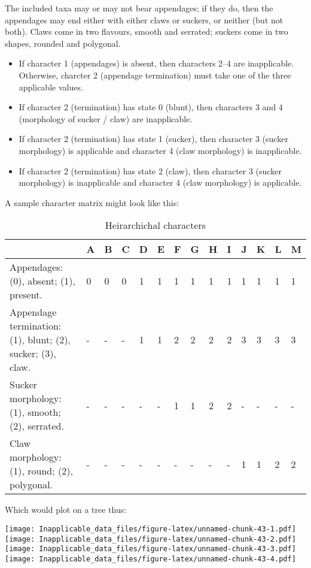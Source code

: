 \documentclass[]{book}
\theoremstyle{definition}
\theoremstyle{definition}
\theoremstyle{definition}
\theoremstyle{remark}
\begin{document}
The included taxa may or may not bear appendages; if they do, then the
appendages may end either with either claws or suckers, or neither (but
not both). Claws come in two flavours, smooth and serrated; suckers come
in two shapes, rounded and polygonal.

\begin{itemize}
\item
  If character 1 (appendages) is absent, then characters 2--4 are
  inapplicable. Otherwise, charcter 2 (appendage termination) must take
  one of the three applicable values.
\item
  If character 2 (termination) has state 0 (blunt), then characters 3
  and 4 (morphology of sucker / claw) are inapplicable.
\item
  If character 2 (termination) has state 1 (sucker), then character 3
  (sucker morphology) is applicable and character 4 (claw morphology) is
  inapplicable.
\item
  If character 2 (termination) has state 2 (claw), then character 3
  (sucker morphology) is inapplicable and character 4 (claw morphology)
  is applicable.
\end{itemize}

A sample character matrix might look like this:

\begin{table}

\caption{\label{tab:unnamed-chunk-42}Heirarchichal characters}
\centering
\begin{tabular}[t]{l|l|l|l|l|l|l|l|l|l|l|l|l|l}
\hline
  & A & B & C & D & E & F & G & H & I & J & K & L & M\\
\hline
Appendages: (0), absent; (1), present. & 0 & 0 & 0 & 1 & 1 & 1 & 1 & 1 & 1 & 1 & 1 & 1 & 1\\
\hline
Appendage termination: (1), blunt; (2), sucker; (3), claw. & - & - & - & 1 & 1 & 2 & 2 & 2 & 2 & 3 & 3 & 3 & 3\\
\hline
Sucker morphology: (1), smooth; (2), serrated. & - & - & - & - & - & 1 & 1 & 2 & 2 & - & - & - & -\\
\hline
Claw morphology: (1), round; (2), polygonal. & - & - & - & - & - & - & - & - & - & 1 & 1 & 2 & 2\\
\hline
\end{tabular}
\end{table}

Which would plot on a tree thus:

\texttt{[image: Inapplicable\_data\_files/figure-latex/unnamed-chunk-43-1.pdf]}
\texttt{[image: Inapplicable\_data\_files/figure-latex/unnamed-chunk-43-2.pdf]}
\texttt{[image: Inapplicable\_data\_files/figure-latex/unnamed-chunk-43-3.pdf]}
\texttt{[image: Inapplicable\_data\_files/figure-latex/unnamed-chunk-43-4.pdf]}
\end{document}

